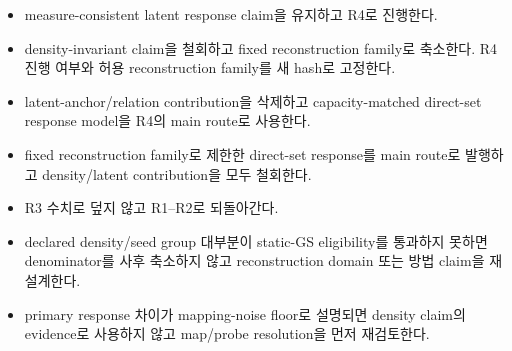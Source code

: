 \documentclass[10pt,a4paper]{article}
\begin{document}
\begin{itemize}
  \item {} measure-consistent latent response claim을 유지하고 R4로 진행한다.
  \item {} density-invariant claim을 철회하고 fixed reconstruction family로 축소한다.
  R4 진행 여부와 허용 reconstruction family를 새 hash로 고정한다.
  \item {} latent-anchor/relation contribution을 삭제하고 capacity-matched direct-set
  response model을 R4의 main route로 사용한다.
  \item {} fixed reconstruction family로 제한한 direct-set response를
  main route로 발행하고 density/latent contribution을 모두 철회한다.
  \item {} R3 수치로 덮지 않고 R1--R2로 되돌아간다.
  \item {} declared density/seed group 대부분이 static-GS eligibility를 통과하지 못하면
  denominator를 사후 축소하지 않고 reconstruction domain 또는 방법 claim을 재설계한다.
  \item {} primary response 차이가 mapping-noise floor로 설명되면
  density claim의 evidence로 사용하지 않고 map/probe resolution을 먼저 재검토한다.
\end{itemize}
\end{document}
